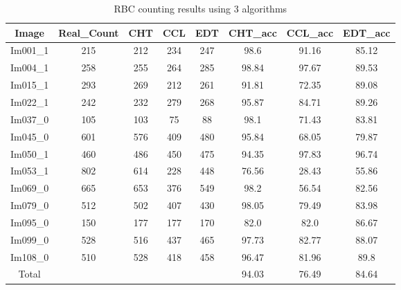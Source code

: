 \begin{table}[H]
\centering
\begin{tabular}{|c|c|c|c|c|c|c|c|}
\hline
 \textbf{Image} & \textbf{Real\_Count} & \textbf{CHT} & \textbf{CCL} & \textbf{EDT} & \textbf{CHT\_acc} & \textbf{CCL\_acc} & \textbf{EDT\_acc} \\ \hline
 Im001\_1 & 215 & 212 & 234 & 247 & 98.6 & 91.16 & 85.12 \\ 
 Im004\_1 & 258 & 255 & 264 & 285 & 98.84 & 97.67 & 89.53 \\ 
 Im015\_1 & 293 & 269 & 212 & 261 & 91.81 & 72.35 & 89.08 \\ 
 Im022\_1 & 242 & 232 & 279 & 268 & 95.87 & 84.71 & 89.26 \\ 
 Im037\_0 & 105 & 103 & 75 & 88 & 98.1 & 71.43 & 83.81 \\ 
 Im045\_0 & 601 & 576 & 409 & 480 & 95.84 & 68.05 & 79.87 \\ 
 Im050\_1 & 460 & 486 & 450 & 475 & 94.35 & 97.83 & 96.74 \\ 
 Im053\_1 & 802 & 614 & 228 & 448 & 76.56 & 28.43 & 55.86 \\ 
 Im069\_0 & 665 & 653 & 376 & 549 & 98.2 & 56.54 & 82.56 \\ 
 Im079\_0 & 512 & 502 & 407 & 430 & 98.05 & 79.49 & 83.98 \\ 
 Im095\_0 & 150 & 177 & 177 & 170 & 82.0 & 82.0 & 86.67 \\ 
 Im099\_0 & 528 & 516 & 437 & 465 & 97.73 & 82.77 & 88.07 \\ 
 Im108\_0 & 510 & 528 & 418 & 458 & 96.47 & 81.96 & 89.8 \\ \hline
 Total &   &   &   &   & 94.03 & 76.49 & 84.64 \\ 

\hline
\end{tabular}
\caption{RBC counting results using 3 algorithms}
\label{RBC counting results using 3 algorithms}
\end{table}
